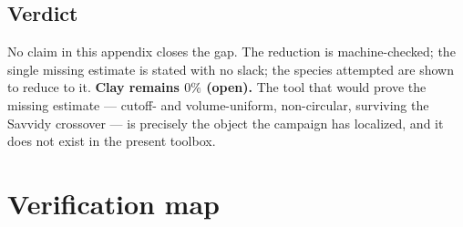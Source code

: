 \subsection{Verdict}

No claim in this appendix closes the gap. The reduction is machine-checked; the single missing
estimate is stated with no slack; the species attempted are shown to reduce to it. \textbf{Clay
remains $0\%$ (open).} The tool that would prove the missing estimate --- cutoff- and
volume-uniform, non-circular, surviving the Savvidy crossover --- is precisely the object the
campaign has localized, and it does not exist in the present toolbox.

\section{Verification map}
\label{app:verif}

